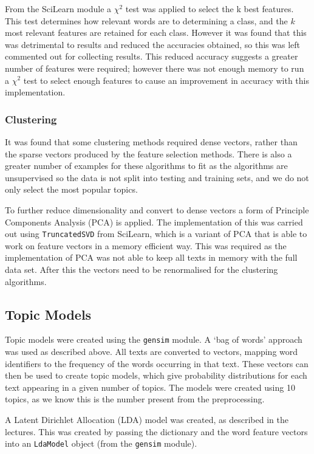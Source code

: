 \documentclass{article}
\begin{document}
From the SciLearn module a $\chi^2$ test was applied to select the k best features. This test determines how relevant words are to determining a class, and the $k$ most relevant features are retained for each class. However it was found that this was detrimental to results and reduced the accuracies obtained, so this was left commented out for collecting results. This reduced accuracy suggests a greater number of features were required; however there was not enough memory to run a $\chi^2$ test to select enough features to cause an improvement in accuracy with this implementation.

\subsubsection{Clustering}
It was found that some clustering methods required dense vectors, rather than the sparse vectors produced by the feature selection methods. There is also a greater number of examples for these algorithms to fit as the algorithms are unsupervised so the data is not split into testing and training sets, and we do not only select the most popular topics.

To further reduce dimensionality and convert to dense vectors a form of Principle Components Analysis (PCA) is applied. The implementation of this was carried out using \verb|TruncatedSVD| from SciLearn, which is a variant of PCA that is able to work on feature vectors in a memory efficient way. This was required as the implementation of PCA was not able to keep all texts in memory with the full data set. After this the vectors need to be renormalised for the clustering algorithms. 

\subsection{Topic Models}
Topic models were created using the \verb|gensim| module. A `bag of words' approach was used as described above. All texts are converted to vectors, mapping word identifiers to the frequency of the words occurring in that text. These vectors can then be used to create topic models, which give probability distributions for each text appearing in a given number of topics. The models were created using 10 topics, as we know this is the number present from the preprocessing.

A Latent Dirichlet Allocation (LDA) model was created, as described in the lectures. This was created by passing the dictionary and the word feature vectors into an \verb|LdaModel| object (from the \verb|gensim| module).
\end{document}
